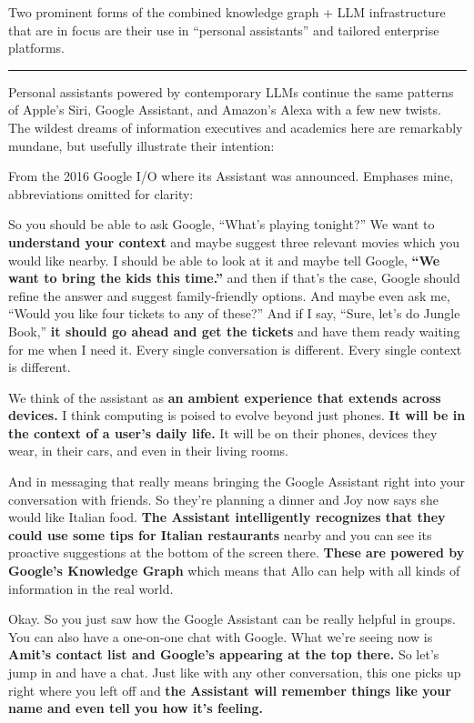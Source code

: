 \documentclass{article}
\renewenvironment{leftbar}
{\vspace{6pt}\def\FrameCommand{\hspace{0em}\vrule width 0.5pt \hspace{1em}}\MakeFramed {\advance\hsize-\width \FrameRestore}}
{\endMakeFramed}
\begin{document}
Two prominent forms of the combined knowledge graph + LLM infrastructure
that are in focus are their use in ``personal assistants'' and tailored
enterprise platforms.

\begin{center}\rule{0.5\linewidth}{0.5pt}\end{center}

Personal assistants powered by contemporary LLMs continue the same
patterns of Apple's Siri, Google Assistant, and Amazon's Alexa with a
few new twists. The wildest dreams of information executives and
academics here are remarkably mundane, but usefully illustrate their
intention:

From the 2016 Google I/O where its Assistant was announced.
Emphases mine, abbreviations omitted for clarity:

\begin{leftbar}
So you should be able to ask Google, ``What's playing tonight?'' We want
to \textbf{understand your context} and maybe suggest three relevant
movies which you would like nearby. I should be able to look at it and
maybe tell Google, \textbf{``We want to bring the kids this time.''} and
then if that's the case, Google should refine the answer and suggest
family-friendly options. And maybe even ask me, ``Would you like four
tickets to any of these?'' And if I say, ``Sure, let's do Jungle Book,''
\textbf{it should go ahead and get the tickets} and have them ready
waiting for me when I need it. Every single conversation is different.
Every single context is different.

We think of the assistant as \textbf{an ambient experience that extends
across devices.} I think computing is poised to evolve beyond just
phones. \textbf{It will be in the context of a user's daily life.} It
will be on their phones, devices they wear, in their cars, and even in
their living rooms.

And in messaging that really means bringing the Google Assistant right
into your conversation with friends. So they're planning a dinner and
Joy now says she would like Italian food. \textbf{The Assistant
intelligently recognizes that they could use some tips for Italian
restaurants} nearby and you can see its proactive suggestions at the
bottom of the screen there. \textbf{These are powered by Google's
Knowledge Graph} which means that Allo can help with all kinds of
information in the real world.

Okay. So you just saw how the Google Assistant can be really helpful in
groups. You can also have a one-on-one chat with Google. What we're
seeing now is \textbf{Amit's contact list and Google's appearing at the
top there.} So let's jump in and have a chat. Just like with any other
conversation, this one picks up right where you left off and \textbf{the
Assistant will remember things like your name and even tell you how it's
feeling.} \cite{sGoogle2016Keynote2016} 
\end{leftbar}
\end{document}
